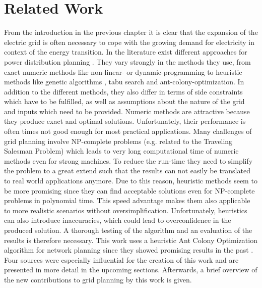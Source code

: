 \chapter{Related Work}\label{chap:relatedwork}

From the introduction in the previous chapter it is clear that the expansion of the electric grid is often necessary to cope with the growing demand for electricity in context of the energy transition. In the literature exist different approaches for power distribution planning \cite{review}. They vary strongly in the methods they use, from exact numeric methods like non-linear- or dynamic-programming \cite{non_linear_programming, dynamic_programming} to heuristic methods like genetic algorithms \cite{genetic_algo}, tabu search \cite{tabu_search} and ant-colony-optimization. In addition to the different methods, they also differ in terms of side constraints which have to be fulfilled, as well as assumptions about the nature of the grid and inputs which need to be provided. Numeric methods are attractive because they produce exact and optimal solutions. Unfortunately, their performance is often times not good enough for most practical applications. Many challenges of grid planning involve NP-complete problems (e.g. related to the Traveling Salesman Problem) which leads to very long computational time of numeric methods even for strong machines. To reduce the run-time they need to simplify the problem to a great extend such that the results can not easily be translated to real world applications anymore. Due to this reason, heuristic methods seem to be more promising since they can find acceptable solutions even for NP-complete problems in polynomial time. This speed advantage makes them also applicable to more realistic scenarios without oversimplification. Unfortunately, heuristics can also introduce inaccuracies, which could lead to overconfidence in the produced solution. A thorough testing of the algorithm and an evaluation of the results is therefore necessary. This work uses a heuristic Ant Colony Optimization algorithm for network planning since they showed promising results in the past \cite{ant_system}\cite{bonabeau1999swarm}\cite{ant_coloy_system}.\\ Four sources were especially influential for the creation of this work and are presented in more detail in the upcoming sections. Afterwards, a brief overview of the new contributions to grid planning by this work is given.

